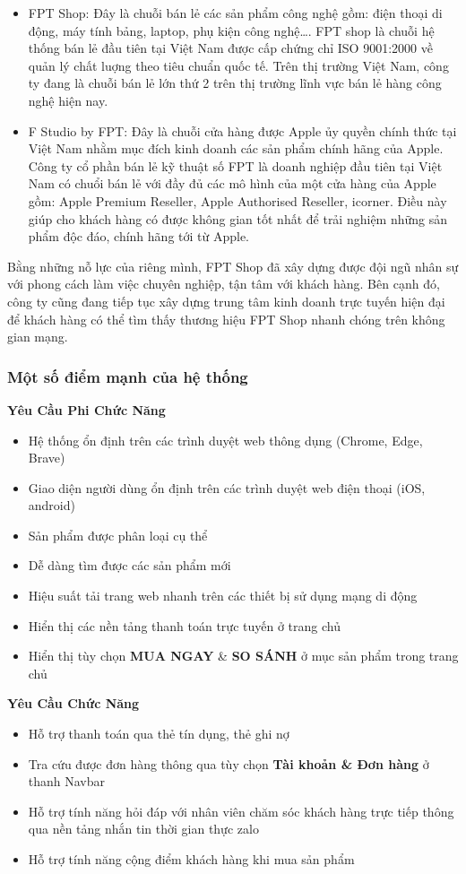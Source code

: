 \begin{itemize}
    \item FPT Shop: Đây là chuỗi bán lẻ các sản phẩm công nghệ gồm: điện thoại di động, máy tính bảng, laptop, phụ kiện công nghệ…. FPT shop là chuỗi hệ thống bán lẻ đầu tiên tại Việt Nam được cấp chứng chỉ ISO 9001:2000 về quản lý chất luợng theo tiêu chuẩn quốc tế. Trên thị trường Việt Nam, công ty đang là chuỗi bán lẻ lớn thứ 2 trên thị trường lĩnh vực bán lẻ hàng công nghệ hiện nay.
    \item F Studio by FPT: Đây là chuỗi cửa hàng được Apple ủy quyền chính thức tại Việt Nam nhằm mục đích kinh doanh các sản phẩm chính hãng của Apple. Công ty cổ phần bán lẻ kỹ thuật số FPT là doanh nghiệp đầu tiên tại Việt Nam có chuổi bán lẻ với đầy đủ các mô hình của một cửa hàng của Apple gồm: Apple Premium Reseller, Apple Authorised Reseller, icorner. Điều này giúp cho khách hàng có được không gian tốt nhất để trải nghiệm những sản phẩm độc đáo, chính hãng tới từ Apple.
\end{itemize}

Bằng những nỗ lực  của riêng mình, FPT Shop đã xây dựng được đội ngũ nhân sự với phong cách làm việc chuyên nghiệp, tận tâm với khách hàng. Bên cạnh đó, công ty cũng đang tiếp tục xây dựng trung tâm kinh doanh trực tuyến hiện đại để khách hàng có thể tìm thấy thương hiệu FPT Shop nhanh chóng trên không gian mạng.

\subsubsection{Một số điểm mạnh của hệ thống}
\textbf{Yêu Cầu Phi Chức Năng}
\begin{itemize}
    \item Hệ thống ổn định trên các trình duyệt web thông dụng (Chrome, Edge, Brave)
    \item Giao diện người dùng ổn định trên các trình duyệt web điện thoại (iOS, android)
    \item Sản phẩm được phân loại cụ thể
    \item Dễ dàng tìm được các sản phẩm mới
    \item Hiệu suất tải trang web nhanh trên các thiết bị sử dụng mạng di động
    \item Hiển thị các nền tảng thanh toán trực tuyến ở trang chủ
    \item Hiển thị tùy chọn \textbf{MUA NGAY} \& \textbf{SO SÁNH} ở mục sản phẩm trong trang chủ
\end{itemize}
\textbf{Yêu Cầu Chức Năng}
\begin{itemize}
    \item Hỗ trợ thanh toán qua thẻ tín dụng, thẻ ghi nợ
    \item Tra cứu được đơn hàng thông qua tùy chọn \textbf{Tài khoản \& Đơn hàng} ở thanh Navbar
    \item Hỗ trợ tính năng hỏi đáp với nhân viên chăm sóc khách hàng trực tiếp thông qua nền tảng nhắn tin thời gian thực zalo
    \item Hỗ trợ tính năng cộng điểm khách hàng khi mua sản phẩm
\end{itemize}

